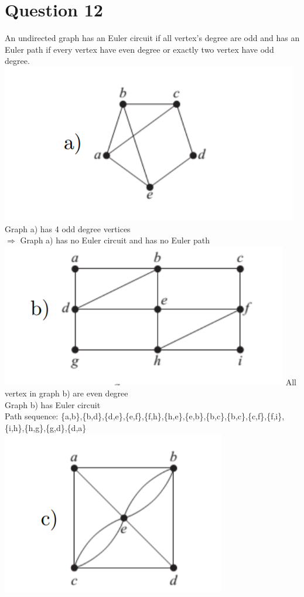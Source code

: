 \documentclass{article}
\begin{document}
\section*{Question 12}
An undirected graph has an Euler circuit if all vertex's degree are odd and has an Euler path if every vertex have even degree or exactly two vertex have odd degree.
\newline
\includegraphics[]{Question 12/connectivity_12.a.png}
\newline
Graph a) has 4 odd degree vertices\\
$\Rightarrow$ Graph a) has no Euler circuit and has no Euler path
\newline
\includegraphics[]{Question 12/connectivity_12.b.png}
\newline
All vertex in graph b) are even degree\\
Graph b) has Euler circuit\\
Path sequence: \{a,b\},\{b,d\},\{d,e\},\{e,f\},\{f,h\},\{h,e\},\{e,b\},\{b,c\},\{b,c\},\{c,f\},\{f,i\},\{i,h\},\{h,g\},\{g,d\},\{d,a\}
\newline
\includegraphics[]{Question 12/connectivity_12.c.png}
\end{document}
